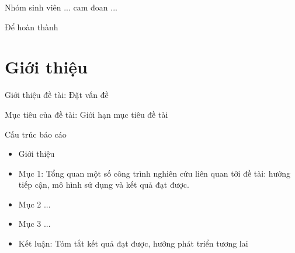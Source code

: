 \documentclass[fontsize=13pt,a4paper,oneside, DIV=calc, chapterprefix=true]{scrbook} %
\begin{document}
\coverpage

\secondcoverpage

\frontmatter


\begin{declaration}
Nhóm sinh viên ... cam đoan ...
\end{declaration}

\begin{acknowledgments}
Để hoàn thành  
\end{acknowledgments}

\begin{abstract}
Nội dung chính của tiểu luận ...    
\end{abstract}
 
\printnomenclature

\tableofcontents
\listoffigures

\mainmatter

\fancyhead{}  %
\renewcommand{\footrulewidth}{0.4pt}

\pagestyle{fancy}  %
%

\chapter*{Giới thiệu }
\label{chap:intro}
	
{Giới thiệu đề tài}: Đặt vấn đề
 
{Mục tiêu của đề tài}: Giới hạn mục tiêu đề tài

{Cấu trúc báo cáo}
 
\begin{itemize}
\item Giới thiệu 
\item Mục 1: Tổng quan một số công trình nghiên cứu liên quan tới đề tài: hướng tiếp cận, mô hình sử dụng và kết quả đạt được.
\item Mục 2 ...
\item Mục 3 ...
\item Kết luận: Tóm tắt kết quả đạt được, hướng phát triển tương lai
\end{itemize}
\end{document}
